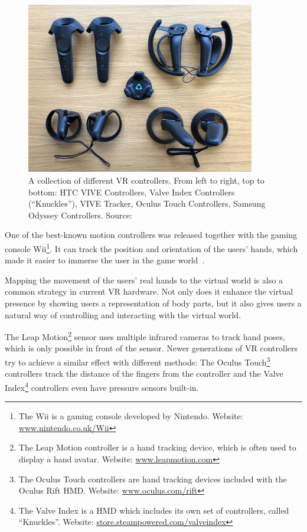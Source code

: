 \begin{figure}[H]%
	\centering%
	\includegraphics[width=10cm]{figures/introduction/vr_controllers.jpg}%
  \caption[Collection of VR controllers]{A collection of different \gls{VR} controllers. From left to right, top to bottom: HTC VIVE Controllers, Valve Index Controllers (\enquote{Knuckles}), VIVE Tracker, Oculus Touch Controllers, Samsung Odyssey Controllers.
  \newline{}
  Source:~\cite{Yang.2018}}\label{fig:vr-controllers}
\end{figure}

One of the best-known motion controllers was released together with the gaming console Wii\footnote{The Wii is a gaming console developed by Nintendo. Website: \href{https://www.nintendo.co.uk/Wii/Wii-94559.html}{www.nintendo.co.uk/Wii}}. It can track the position and orientation of the users' hands, which made it easier to immerse the user in the game world~\cite[2]{Kamm.2018}.

Mapping the movement of the users' real hands to the virtual world is also a common strategy in current \gls{VR} hardware. Not only does it enhance the virtual presence by showing users a representation of body parts, but it also gives users a natural way of controlling and interacting with the virtual world.

The Leap Motion\footnote{The Leap Motion controller is a hand tracking device, which is often used to display a hand avatar. Website: \href{https://www.leapmotion.com/}{www.leapmotion.com}} sensor uses multiple infrared cameras to track hand poses, which is only possible in front of the sensor. Newer generations of \gls{VR} controllers try to achieve a similar effect with different methods: The Oculus Touch\footnote{The Oculus Touch controllers are hand tracking devices included with the Oculus Rift \gls{HMD}. Website: \href{https://www.oculus.com/rift/}{www.oculus.com/rift}} controllers track the distance of the fingers from the controller and the Valve Index\footnote{The Valve Index is a \gls{HMD} which includes its own set of controllers, called \enquote{Knuckles}. Website: \href{https://store.steampowered.com/valveindex}{store.steampowered.com/valveindex}} controllers even have pressure sensors built-in.

